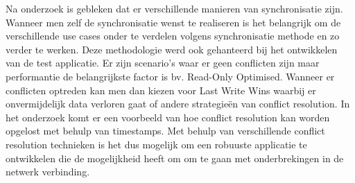 Na onderzoek is gebleken dat er verschillende manieren van synchronisatie zijn.  Wanneer men zelf de synchronisatie wenst te realiseren is het belangrijk om de verschillende use cases onder te verdelen volgens synchronisatie methode en zo verder te werken. Deze methodologie werd ook gehanteerd bij het ontwikkelen van de test applicatie. Er zijn scenario's waar er geen conflicten zijn maar performantie de belangrijkste factor is bv. Read-Only Optimised. Wanneer er conflicten optreden kan men dan kiezen voor Last Write Wins waarbij er onvermijdelijk data verloren gaat of andere strategie\"en van conflict resolution. In het onderzoek komt er een voorbeeld van hoe conflict resolution kan worden opgelost met behulp van timestamps. Met behulp van verschillende conflict resolution technieken is het dus mogelijk om een robuuste applicatie te ontwikkelen die de mogelijkheid heeft om om te gaan met onderbrekingen in de netwerk verbinding.